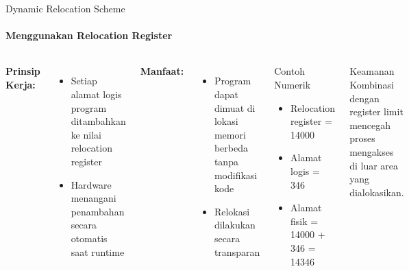 \documentclass[10pt,aspectratio=169]{beamer}
\begin{document}
\begin{frame}{Dynamic Relocation Scheme}
    \framesubtitle{Menggunakan Relocation Register}
    
    \begin{columns}[T]
            \textbf{Prinsip Kerja:}
                        \begin{itemize}
                            \item Setiap alamat logis program ditambahkan ke nilai relocation register
                            \item Hardware menangani penambahan secara otomatis saat runtime
                        \end{itemize}
                        
                        \textbf{Manfaat:}
                        \begin{itemize}
                            \item Program dapat dimuat di lokasi memori berbeda tanpa modifikasi kode
                            \item Relokasi dilakukan secara transparan
                        \end{itemize}
            
            \begin{block}{Contoh Numerik}
                \begin{itemize}
                    \item Relocation register = 14000
                    \item Alamat logis = 346
                    \item Alamat fisik = 14000 + 346 = 14346
                \end{itemize}
            \end{block}
            
            \begin{alertblock}{Keamanan}
                Kombinasi dengan register limit mencegah proses mengakses di luar area yang dialokasikan.
            \end{alertblock}
    \end{columns}
\end{frame}
\end{document}
